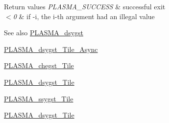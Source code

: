 \begin{DoxyRetVals}{Return values}
{\em P\+L\+A\+S\+M\+A\+\_\+\+S\+U\+C\+C\+E\+S\+S} & successful exit \\
\hline
{\em $<$0} & if -\/i, the i-\/th argument had an illegal value\\
\hline
\end{DoxyRetVals}
\begin{DoxySeeAlso}{See also}
\hyperlink{group__double_ga7ab44c615960d36295086012efc45a7d_ga7ab44c615960d36295086012efc45a7d}{P\+L\+A\+S\+M\+A\+\_\+dsygst} 

\hyperlink{group__double__Tile__Async_ga81f098686ef0966de91ce9d450ee22e6_ga81f098686ef0966de91ce9d450ee22e6}{P\+L\+A\+S\+M\+A\+\_\+dsygst\+\_\+\+Tile\+\_\+\+Async} 

\hyperlink{group__PLASMA__Complex32__t__Tile_ga4315d3e8b6248219e35e1d181dd13b68_ga4315d3e8b6248219e35e1d181dd13b68}{P\+L\+A\+S\+M\+A\+\_\+chegst\+\_\+\+Tile} 

\hyperlink{group__double__Tile_ga3500cf0cf6d6b233f3f1078d5f5057d8_ga3500cf0cf6d6b233f3f1078d5f5057d8}{P\+L\+A\+S\+M\+A\+\_\+dsygst\+\_\+\+Tile} 

\hyperlink{group__float__Tile_ga47edc276e115a0eb253b2a4bda9a3b9e_ga47edc276e115a0eb253b2a4bda9a3b9e}{P\+L\+A\+S\+M\+A\+\_\+ssygst\+\_\+\+Tile} 

\hyperlink{group__double__Tile_ga3500cf0cf6d6b233f3f1078d5f5057d8_ga3500cf0cf6d6b233f3f1078d5f5057d8}{P\+L\+A\+S\+M\+A\+\_\+dsygst\+\_\+\+Tile} 
\end{DoxySeeAlso}
\hypertarget{group__double__Tile_ga4b8b807aca8e84087b88ffdac3d07b8c_ga4b8b807aca8e84087b88ffdac3d07b8c}{}
